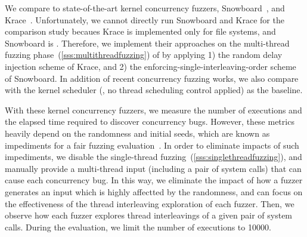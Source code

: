 %
We compare \sys to state-of-the-art kernel concurrency fuzzers,
Snowboard~\cite{snowboard}, and Krace~\cite{krace}.
%
Unfortunately, we cannot directly run Snowboard and Krace for the
comparison study becaues Krace is implemented only for file systems,
and Snowboard is \dr{}.
%
Therefore, we implement their approaches on the multi-thread fuzzing
phase~(\autoref{sss:multithreadfuzzing}) of \sys by applying 1) the
random delay injection scheme of Krace, and 2) the
enforcing-single-interleaving-order scheme of Snowboard.
%
In addition of recent concurrency fuzzing works, we also compare with
the kernel scheduler (\ie, no thread scheduling control applied) as
the baseline.


%
With these kernel concurrency fuzzers, we measure the number of
executions and the elapsed time required to discover concurrency bugs.
%
However, these metrics heavily depend on the randomness and initial
seeds, which are known as impediments for a fair fuzzing
evaluation~\cite{fuzzingeval}.
%
In order to eliminate impacts of such impediments, we disable the
single-thread fuzzing~(\autoref{sss:singlethreadfuzzing}), and
manually provide a multi-thread input (including a pair of system
calls) that can cause each concurrency bug.
%
In this way, we eliminate the impact of how a fuzzer generates an
input which is highly affectted by the randomness, and can focus on
the effectiveness of the thread interleaving exploration of each
fuzzer.
%
Then, we observe how each fuzzer explores thread interleavings of a
given pair of system calls. During the evaluation, we limit the number
of executions to 10000.





